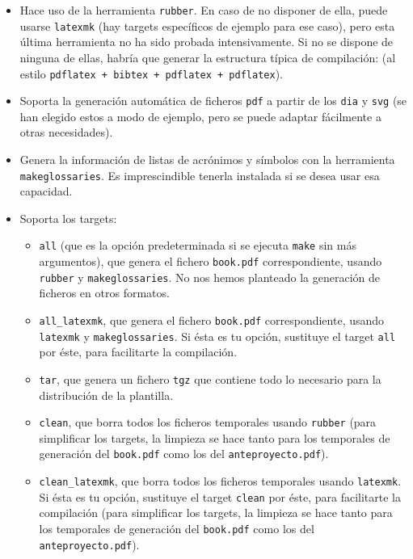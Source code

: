 \begin{itemize}

  \item Hace uso de la herramienta \texttt{rubber}. En caso de no disponer de ella, puede usarse \texttt{latexmk} (hay targets específicos de ejemplo para ese caso), pero esta última herramienta no ha sido probada intensivamente. Si no se dispone de ninguna de ellas, habría que generar la estructura típica de compilación: (al estilo \texttt{pdflatex + bibtex + pdflatex + pdflatex}).
  \item Soporta la generación automática de ficheros \texttt{pdf} a partir de los \texttt{dia} y \texttt{svg} (se han elegido estos a modo de ejemplo, pero se puede adaptar fácilmente a otras necesidades).
  \item Genera la información de listas de acrónimos y símbolos con la herramienta \texttt{makeglossaries}. Es imprescindible tenerla instalada si se desea usar esa capacidad.
  \item Soporta los targets:
        \begin{itemize}
          \item \texttt{all} (que es la opción predeterminada si se ejecuta \texttt{make} sin más argumentos), que genera el fichero \texttt{book.pdf} correspondiente, usando \texttt{rubber} y \texttt{makeglossaries}. No nos hemos planteado la generación de ficheros en otros formatos.
          \item \texttt{all\_latexmk}, que genera el fichero \texttt{book.pdf} correspondiente, usando \texttt{latexmk} y \texttt{makeglossaries}. Si ésta es tu opción, sustituye el target \texttt{all} por éste, para facilitarte la compilación.

          \item \texttt{tar}, que genera un fichero \texttt{tgz} que contiene todo lo necesario para la distribución de la plantilla.
          \item \texttt{clean}, que borra todos los ficheros temporales usando \texttt{rubber} (para simplificar los targets, la limpieza se hace tanto para los temporales de generación del \texttt{book.pdf} como los del \texttt{anteproyecto.pdf}).
          \item \texttt{clean\_latexmk}, que borra todos los ficheros temporales usando \texttt{latexmk}. Si ésta es tu opción, sustituye el target \texttt{clean} por éste, para facilitarte la compilación (para simplificar los targets, la limpieza se hace tanto para los temporales de generación del \texttt{book.pdf} como los del \texttt{anteproyecto.pdf}).


\end{itemize}
\end{itemize}
